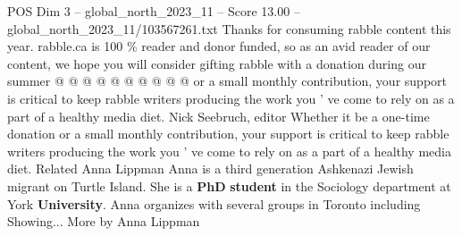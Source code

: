 \begin{textsample}{POS Dim 3 – global\_north\_2023\_11 – Score 13.00 – global\_north\_2023\_11/103567261.txt}
Thanks for consuming rabble content this year. rabble.ca is 100 \% reader and donor funded, so as an avid reader of our content, we hope you will consider gifting rabble with a donation during our summer @ @ @ @ @ @ @ @ @ @ or a small monthly contribution, your support is critical to keep rabble writers producing the work you ' ve come to rely on as a part of a healthy media diet.
Nick Seebruch, editor Whether it be a one-time donation or a small monthly contribution, your support is critical to keep rabble writers producing the work you ' ve come to rely on as a part of a healthy media diet.
Related Anna Lippman Anna is a third generation Ashkenazi Jewish migrant on Turtle Island.
She is a \textbf{PhD} \textbf{student} in the Sociology department at York \textbf{University}.
Anna organizes with several groups in Toronto including Showing...
More by Anna Lippman

\end{textsample}
